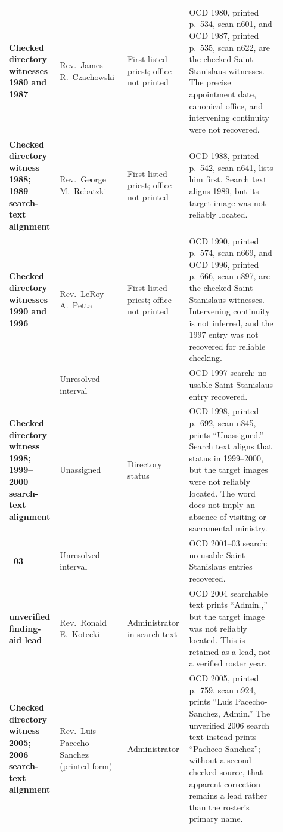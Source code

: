 \begin{longtable}{>{\bfseries\RaggedRight\arraybackslash}p{0.14\linewidth}>{\RaggedRight\arraybackslash}p{0.24\linewidth}>{\RaggedRight\arraybackslash}p{0.20\linewidth}>{\RaggedRight\arraybackslash}p{0.33\linewidth}}
Checked directory witnesses 1980 and 1987 & Rev.~James R.~Czachowski & First-listed priest; office not printed & OCD 1980, printed p.~534, scan n601, and OCD 1987, printed p.~535, scan n622, are the checked Saint Stanislaus witnesses. The precise appointment date, canonical office, and intervening continuity were not recovered.\\

Checked directory witness 1988; 1989 search-text alignment & Rev.~George M.~Rebatzki & First-listed priest; office not printed & OCD 1988, printed p.~542, scan n641, lists him first. Search text aligns 1989, but its target image was not reliably located.\\

Checked directory witnesses 1990 and 1996 & Rev.~LeRoy A.~Petta & First-listed priest; office not printed & OCD 1990, printed p.~574, scan n669, and OCD 1996, printed p.~666, scan n897, are the checked Saint Stanislaus witnesses. Intervening continuity is not inferred, and the 1997 entry was not recovered for reliable checking.\\

1997 & Unresolved interval & --- & OCD 1997 search: no usable Saint Stanislaus entry recovered.\\

Checked directory witness 1998; 1999--2000 search-text alignment & Unassigned & Directory status & OCD 1998, printed p.~692, scan n845, prints ``Unassigned.'' Search text aligns that status in 1999--2000, but the target images were not reliably located. The word does not imply an absence of visiting or sacramental ministry.\\

2001--03 & Unresolved interval & --- & OCD 2001--03 search: no usable Saint Stanislaus entries recovered.\\

2004 unverified finding-aid lead & Rev.~Ronald E.~Kotecki & Administrator in search text & OCD 2004 searchable text prints ``Admin.,'' but the target image was not reliably located. This is retained as a lead, not a verified roster year.\\

Checked directory witness 2005; 2006 search-text alignment & Rev.~Luis Pacecho-Sanchez (printed form) & Administrator & OCD 2005, printed p.~759, scan n924, prints ``Luis Pacecho-Sanchez, Admin.'' The unverified 2006 search text instead prints ``Pacheco-Sanchez''; without a second checked source, that apparent correction remains a lead rather than the roster's primary name.\\


\end{longtable}
